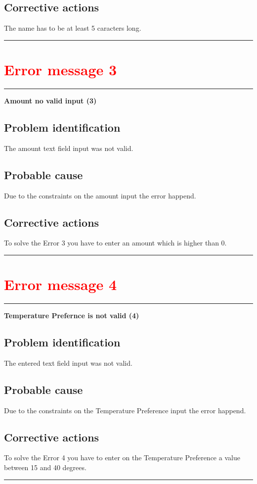 \subsection{Corrective actions}
The name has to be at least 5 caracters long.
\vspace{0.5cm}
\hrule
\hfill
\section{\textbf{\textcolor{red}{Error message 3}}}
\hrule
\vspace{0.5cm}
\textbf{Amount no valid input (3)}
\subsection{Problem identification}
The amount text field input was not valid.

\subsection{Probable cause}
Due to the constraints on the amount input the error happend.

\subsection{Corrective actions}
To solve the Error 3 you have to enter an amount which is higher than 0.
\vspace{0.5cm}
\hrule
\break

\section{\textbf{\textcolor{red}{Error message 4}}}
\hrule
\vspace{0.5cm}
\textbf{Temperature Prefernce is not valid (4)}

\subsection{Problem identification}
The entered text field input was not valid.

\subsection{Probable cause}
Due to the constraints on the Temperature Preference input the error happend.

\subsection{Corrective actions}
To solve the Error 4 you have to enter on the Temperature Preference a value
between 15 and 40 degrees.
\vspace{0.5cm}
\hrule
\hfill
